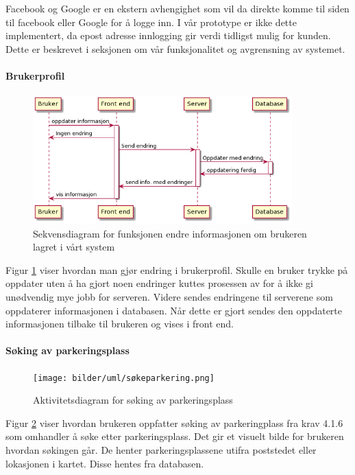 Facebook og Google er en ekstern avhengighet som vil da direkte komme til siden til facebook eller Google for å logge inn. I vår prototype er ikke dette implementert, da epost adresse innlogging gir verdi tidligst mulig for kunden. Dette er beskrevet i seksjonen om vår funksjonalitet og avgrensning av systemet.

\paragraph{Brukerprofil}
\begin{figure}[H]
    \centering
    \includegraphics[width=10cm]{bilder/uml/brukerprofil.png}
    \caption{Sekvensdiagram for funksjonen endre informasjonen om brukeren lagret i vårt system }
    \label{fig:endre_bruker}
\end{figure}
Figur \ref{fig:endre_bruker} viser hvordan man gjør endring i brukerprofil. Skulle en bruker trykke på oppdater uten å ha gjort noen endringer kuttes prosessen av for å ikke gi unødvendig mye jobb for serveren. Videre sendes endringene til serverene som oppdaterer informasjonen i databasen. Når dette er gjort sendes den oppdaterte informasjonen tilbake til brukeren og vises i front end.

\paragraph{Søking av parkeringsplass}
\begin{figure}[H]
    \centering
    \texttt{[image: bilder/uml/søkeparkering.png]}
    \caption{Aktivitetsdiagram for søking av parkeringsplass}
    \label{fig:search_parking}
\end{figure}
Figur \ref{fig:search_parking} viser hvordan brukeren oppfatter søking av parkeringplass fra krav 4.1.6 som omhandler å søke etter parkeringsplass. Det gir et visuelt bilde for brukeren hvordan søkingen går. De henter parkeringsplassene utifra poststedet eller lokasjonen i kartet. Disse hentes fra databasen.

